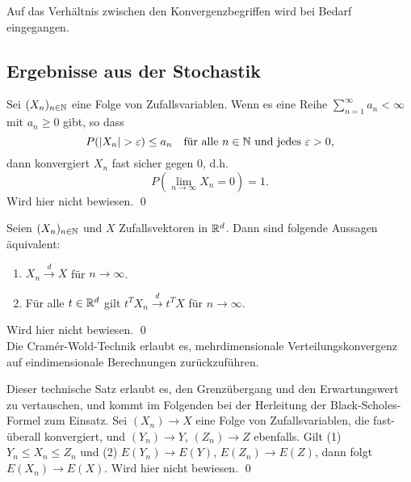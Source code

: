 Auf das Verhältnis zwischen den Konvergenzbegriffen wird bei Bedarf eingegangen.

\subsection{Ergebnisse aus der Stochastik}

\begin{lemma}
Sei $(X_n)_{n \in \Bbb N}$ eine Folge von Zufallsvariablen. Wenn es eine Reihe $\sum_{n=1}^\infty a_n \lt \infty$ mit $a_n \geq 0$ gibt, so dass
$$P(|X_n| > \varepsilon) \leq a_n \quad \text{für alle } n \in \Bbb N \text{ und jedes } \varepsilon > 0,$$
dann konvergiert $X_n$ fast sicher gegen $0$, d.h.
$$P\left(\lim_{n \to \infty} X_n = 0\right) = 1.$$
Wird hier nicht bewiesen. \qed
\end{lemma}

\begin{satz}
Seien $(X_n)_{n \in \Bbb N}$ und $X$ Zufallsvektoren in $\Bbb R^d$. Dann sind folgende Aussagen äquivalent:
\begin{enumerate}
    \item $X_n \xrightarrow{d} X$ für $n \to \infty$.
    \item Für alle $t \in \Bbb R^d$ gilt $t^T X_n \xrightarrow{d} t^T X$ für $n \to \infty$.
\end{enumerate}
Wird hier nicht bewiesen. \qed \\
Die Cramér-Wold-Technik erlaubt es, mehrdimensionale Verteilungskonvergenz auf eindimensionale Berechnungen zurückzuführen.
\end{satz}

\begin{satz}
Dieser technische Satz erlaubt es, den Grenzübergang und den Erwartungswert zu vertauschen, und
kommt im Folgenden bei der Herleitung der Black-Scholes-Formel zum Einsatz.
Sei $(X_n) \longrightarrow X$ eine Folge von Zufallsvariablen, die fast-überall konvergiert,
und $(Y_n) \longrightarrow Y$, $(Z_n) \longrightarrow Z$ ebenfalls.
Gilt (1) $Y_n \le X_n \le Z_n$ und (2) $E(Y_n) \longrightarrow E(Y)$, $E(Z_n) \longrightarrow E(Z)$,
dann folgt $E(X_n) \longrightarrow E(X)$. Wird hier nicht bewiesen. \qed
\end{satz}

